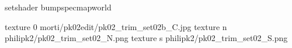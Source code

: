 setshader bumpspecmapworld

texture 0 morti/pk02edit/pk02_trim_set02b_C.jpg
texture n philipk2/pk02_trim_set02_N.png
texture s philipk2/pk02_trim_set02_S.png

